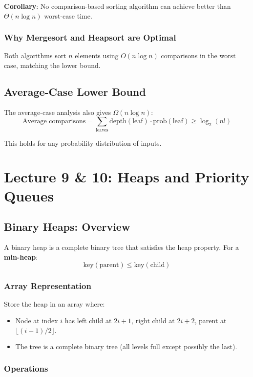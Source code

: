 \documentclass[11pt]{article}
\begin{document}
{{{\textbf{Corollary}: No comparison-based sorting algorithm can achieve better than $\Theta(n \log n)$ worst-case time.

\subsubsection*{Why Mergesort and Heapsort are Optimal}
Both algorithms sort $n$ elements using $O(n \log n)$ comparisons in the worst case, matching the lower bound.

\subsection*{Average-Case Lower Bound}
The average-case analysis also gives $\Omega(n \log n)$:
\[
\text{Average comparisons} = \sum_{\text{leaves}} \text{depth}(\text{leaf}) \cdot \text{prob}(\text{leaf}) \ge \log_2(n!)
\]

This holds for any probability distribution of inputs.

\section{Lecture 9 & 10: Heaps and Priority Queues}

\subsection*{Binary Heaps: Overview}

A binary heap is a complete binary tree that satisfies the heap property. For a \textbf{min-heap}:
\[
\text{key}(\text{parent}) \le \text{key}(\text{child})
\]

\subsubsection*{Array Representation}
Store the heap in an array where:
\begin{itemize}
\item Node at index $i$ has left child at $2i+1$, right child at $2i+2$, parent at $\lfloor (i-1)/2 \rfloor$.
\item The tree is a complete binary tree (all levels full except possibly the last).
\end{itemize}

\subsubsection*{Operations}

}}}
\end{document}
